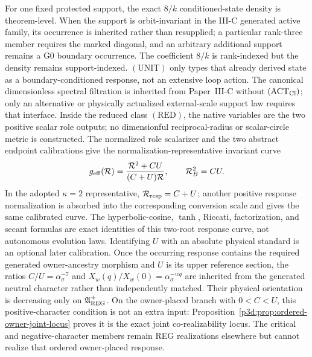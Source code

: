 \documentclass[12pt,a4paper]{article}
\begin{document}
For one fixed protected support, the exact \(8/k\)
conditioned-state density is theorem-level.  When the support is
orbit-invariant in the III-C generated active family, its occurrence is
inherited rather than resupplied; a particular rank-three member requires the
marked diagonal, and an arbitrary additional support remains a G0 boundary
occurrence.
The coefficient \(8/k\) is rank-indexed but the density remains support-indexed.
\((\mathrm{UNIT})\) only types that already derived state as a
boundary-conditioned response, not an extensive loop action.  The canonical
dimensionless spectral filtration is inherited from Paper~III-C without
\((\mathrm{ACT}_{\rm Cl})\); only an alternative or physically actualized
external-scale support law requires that interface.  Inside the
reduced class \((\mathrm{RED})\), the native variables are the two positive
scalar role outputs; no dimensionful reciprocal-radius or
scalar-circle metric is constructed.  The normalized role scalarizer and the two
abstract endpoint calibrations give the normalization-representative invariant
curve
\[
 g_{\rm eff}(\mathcal R)=\frac{\mathcal R^2+CU}{(C+U)\mathcal R},
 \qquad
 \mathcal R_B^2=CU.
\]
In the adopted \(\kappa=2\) representative,
\(\mathcal R_{\rm resp}=C+U\); another positive response normalization is absorbed
into the corresponding conversion scale and gives the same calibrated curve.
The hyperbolic-cosine, \(\tanh\), Riccati, factorization, and secant formulas
are exact identities of this two-root response curve, not autonomous evolution
laws.  Identifying \(U\) with an absolute physical standard is an optional
later calibration.  Once the occurring response contains the required
generated owner-ancestry morphism and \(U\) is its upper reference section,
the ratios
\(C/U=\alpha_\sigma^{-7}\) and
\(X_w(q)/X_w(0)=\alpha_\sigma^{-wq}\) are inherited from the generated
neutral character rather than independently matched.  Their physical
orientation is decreasing only on \(\mathfrak A_{\rm REG}^{+}\).  On the
owner-placed branch with \(0<C<U\), this positive-character condition is not
an extra input: Proposition~\ref{p3d:prop:ordered-owner-joint-locus} proves it
is the exact joint co-realizability locus.  The critical and negative-character
members remain REG realizations elsewhere but cannot realize that ordered
owner-placed response.
\end{document}
